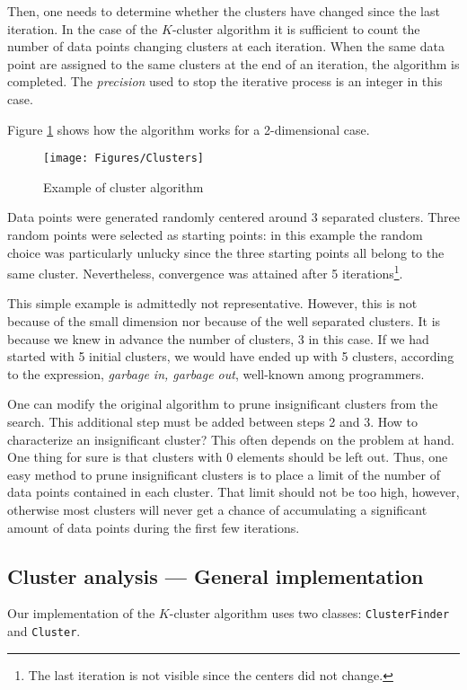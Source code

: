 Then, one needs to determine whether the clusters have changed
since the last iteration. In the case of the $K$-cluster algorithm
it is sufficient to count the number of data points changing
clusters at each iteration. When the same data point are assigned
to the same clusters at the end of an iteration, the algorithm is
completed. The \textsl{precision} used to stop the iterative process
is an integer in this case.

Figure \ref{fig:clustersteps} shows how the algorithm works for a
2-dimensional case.
\begin{figure}
\centering\texttt{[image: Figures/Clusters]}
\caption{Example of cluster algorithm}\label{fig:clustersteps}
\end{figure}
Data points were generated randomly centered around 3 separated
clusters. Three random points were selected as starting points: in
this example the random choice was particularly unlucky since the
three starting points all belong to the same cluster.
Nevertheless, convergence was attained after 5
iterations\footnote{The last iteration is not visible since the
centers did not change.}.

 This simple example is admittedly not
representative. However, this is not because of the small
dimension nor because of the well separated clusters. It is
because we knew in advance the number of clusters, 3 in this case.
If we had started with 5 initial clusters, we would have ended up
with 5 clusters, according to the expression, \textsl{garbage in,
garbage out}, well-known among programmers.

One can modify the original algorithm to prune insignificant
clusters from the search. This additional step must be added
between steps 2 and 3. How to characterize an insignificant
cluster? This often depends on the problem at hand. One thing for
sure is that clusters with 0 elements should be left out. Thus,
one easy method to prune insignificant clusters is to place a
limit of the number of data points contained in each cluster. That
limit should not be too high, however, otherwise most clusters
will never get a chance of accumulating a significant amount of
data points during the first few iterations.

\subsection{Cluster analysis --- General implementation}
 Our implementation of
the $K$-cluster algorithm uses two classes: \texttt{ClusterFinder}
and \texttt{Cluster}.

